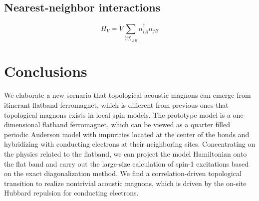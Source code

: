 \documentclass[a0,portrait]{a0poster}
\newcommand\myfigure[6]{%
  \ifdim#2>.8\linewidth
    {%
      \centering
      \texttt{[image: \#4]}%
      \captionof{figure}{#5}%
      \label{#6}%
    }%
  \else
  \begin{figure}
    \texttt{[image: \#4]}
    \caption{#5}
    \label{#6}%
  \end{figure}
  \fi
}
\begin{document}
\begin{multicols}{2}
\begin{multicols}{2}
\subsection*{Nearest-neighbor interactions}

\begin{equation}\label{V}
H_{V}=V\sum_{\langle ij\rangle_{AB}}n_{iA}^\dagger n_{jB}
\end{equation}

\myfigure{R}{1.0\linewidth}{\linewidth}{v_spectrum.pdf}{(a)-(d) Spin-1 excitation spectra calculated by PED with $N_q=800$ of Eq. (\ref{model}) perturbed by Eq. (\ref{V}) with (a) $U_s=0.30$, $V=0$, (b) $U_s=0.30$, $V=0.09$, (c) $U_s=0.30$, $V=0.40$, (d) $U_s=0.30$, $V=0.64$. The shaded area represents the Stoner continuum. (e) The phase diagram in the $V$-$U_s$ parameter space. NFM, FM and TFM represents nonferromagnetic phase, ferromagnetic magnons and topological ferromagnetic magnons, respectively. Red stars mark the parameters used in (a)-(d). Other parameters are fixed at $t=1.0$, $\lambda=1.25$, $U_d=1.0$.}{vspectrum}

\end{multicols}

\section*{Conclusions}
\par We elaborate a new scenario that topological acoustic magnons can emerge from itinerant flatband ferromagnet, which is different from previous ones that topological magnons exists in local spin models. The prototype model is a one-dimensional flatband ferromagnet, which can be viewed as a quarter filled periodic Anderson model with impurities located at the center of the bonds and hybridizing with conducting electrons at their neighboring sites. Concentrating on the physics related to the flatband, we can project the model Hamiltonian onto the flat band and carry out the large-size calculation of spin-1 excitations based on the exact diagonalization method. We find a correlation-driven topological transition to realize nontrivial acoustic magnons, which is driven by the on-site Hubbard repulsion for conducting electrons.

\color{DarkSlateGray} %


\end{multicols}
\end{document}
